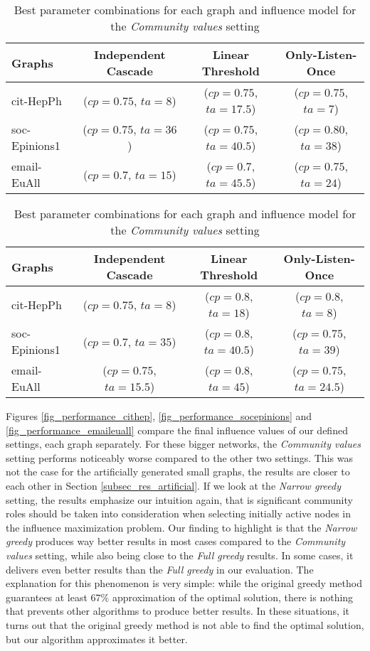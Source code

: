 \documentclass[pdflatex,sn-mathphys-ay]{sn-jnl}
\begin{document}
\begin{table}[ht]
\caption{Best parameter combinations for each graph and influence model for the \textit{Narrow greedy} setting}
\label{table_best_combinations_narrow_big}
\centering
\begin{tabular}{@{}l|ccc@{}}
\toprule
Graphs & Independent Cascade & Linear Threshold & Only-Listen-Once \\
\midrule
cit-HepPh & ($cp=0.75$, $ta=8$) & ($cp=0.75$, $ta=17.5$) & ($cp=0.75$, $ta=7$) \\
soc-Epinions1 & ($cp=0.75$, $ta=36$) & ($cp=0.75$, $ta=40.5$) & ($cp=0.80$, $ta=38$) \\
email-EuAll & ($cp=0.7$, $ta=15$) & ($cp=0.7$, $ta=45.5$) & ($cp=0.75$, $ta=24$) \\
\bottomrule
\end{tabular}
\vspace{5mm}
\caption{Best parameter combinations for each graph and influence model for the \textit{Community values} setting}
\label{table_best_combinations_community_values_big}
\centering
\begin{tabular}{@{}l|ccc@{}}
\toprule
Graphs & Independent Cascade & Linear Threshold & Only-Listen-Once \\
\midrule
cit-HepPh & ($cp=0.75$, $ta=8$) & ($cp=0.8$, $ta=18$) & ($cp=0.8$, $ta=8$) \\
soc-Epinions1 & ($cp=0.7$, $ta=35$) & ($cp=0.8$, $ta=40.5$) & ($cp=0.75$, $ta=39$) \\
email-EuAll & ($cp=0.75$, $ta=15.5$) & ($cp=0.8$, $ta=45$) & ($cp=0.75$, $ta=24.5$) \\
\bottomrule
\end{tabular}
\end{table}

Figures \ref{fig_performance_cithep}, \ref{fig_performance_socepinions} and \ref{fig_performance_emaileuall} compare the final influence values of our defined settings, each graph separately. For these bigger networks, the \textit{Community values} setting performs noticeably worse compared to the other two settings. This was not the case for the artificially generated small graphs, the results are closer to each other in Section \ref{subsec_res_artificial}. If we look at the \textit{Narrow greedy} setting, the results emphasize our intuition again, that is significant community roles should be taken into consideration when selecting initially active nodes in the influence maximization problem. Our finding to highlight is that the \textit{Narrow greedy} produces way better results in most cases compared to the \textit{Community values} setting, while also being close to the \textit{Full greedy} results. In some cases, it delivers even better results than the \textit{Full greedy} in our evaluation. The explanation for this phenomenon is very simple: while the original greedy method guarantees at least $67\%$ approximation of the optimal solution, there is nothing that prevents other algorithms to produce better results. In these situations, it turns out that the original greedy method is not able to find the optimal solution, but our algorithm approximates it better.
\end{document}
